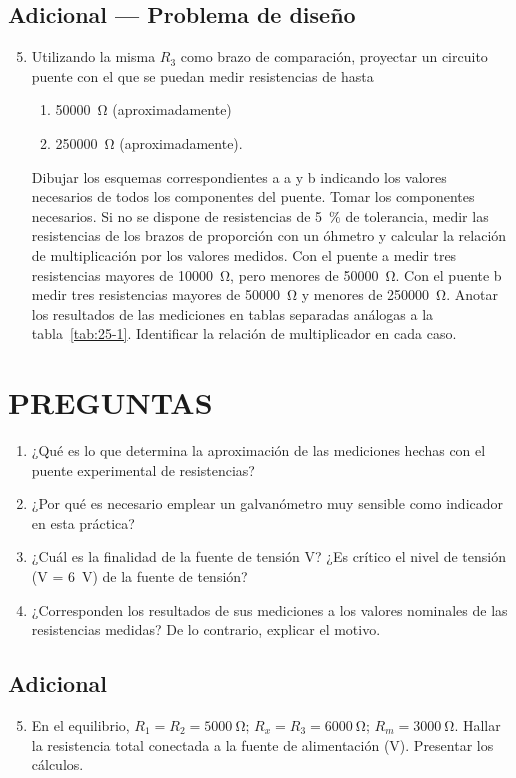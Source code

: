\documentclass{article}
\numberwithin{equation}{subsection}
\numberwithin{figure}{section}
\numberwithin{table}{section}
\begin{document}
\subsection{Adicional — Problema de diseño}
\begin{enumerate}
    \setcounter{enumi}{4}
    \item Utilizando la misma $R_3$ como brazo de comparación, proyectar un circuito puente con el que se puedan medir 
    resistencias de hasta
    \begin{enumerate}
        \item \SI{50000}{\ohm} (aproximadamente)
        \item \SI{250000}{\ohm} (aproximadamente).
    \end{enumerate}
    Dibujar los esquemas correspondientes a a y b indicando los valores necesarios de todos los componentes 
    del puente. Tomar los componentes necesarios. Si no se dispone de resistencias de \SI{5}{\percent} de tolerancia, 
    medir las resistencias de los brazos de proporción con un óhmetro y calcular la relación de multiplicación 
    por los valores medidos. Con el puente a medir tres resistencias mayores de \SI{10000}{\ohm}, pero menores 
    de \SI{50000}{\ohm}. Con el puente b medir tres resistencias mayores de \SI{50000}{\ohm} y menores de \SI{250000}{\ohm}.
    Anotar los resultados de las mediciones en tablas separadas análogas a la tabla~\ref{tab:25-1}. Identificar la relación 
    de multiplicador en cada caso.
\end{enumerate}

\section{PREGUNTAS}
\begin{enumerate}
    \item ¿Qué es lo que determina la aproximación de las mediciones hechas con el puente experimental de resistencias?
    \item ¿Por qué es necesario emplear un galvanómetro muy sensible como indicador en esta práctica?
    \item ¿Cuál es la finalidad de la fuente de tensión V? ¿Es crítico el nivel de tensión (V = \SI{6}{\volt}) de la 
    fuente de tensión?
    \item ¿Corresponden los resultados de sus mediciones a los valores nominales de las resistencias medidas? De lo 
    contrario, explicar el motivo.
\end{enumerate}

\subsection{Adicional}
\begin{enumerate}
    \setcounter{enumi}{4}
    \item En el equilibrio, $R_1 = R_2 = \SI{5000}{\ohm}$; $R_x = R_3 = \SI{6000}{\ohm}$; $R_m = \SI{3000}{\ohm}$. Hallar la 
    resistencia total conectada a la fuente de alimentación (V). Presentar los cálculos.
\end{enumerate}
\end{document}
